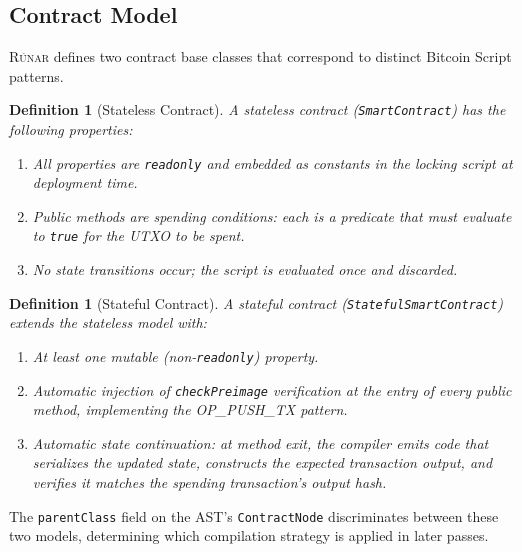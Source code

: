\documentclass[11pt,a4paper]{article}
\newtheorem{definition}[theorem]{Definition}
\newcommand{\runar}{\textsc{Rúnar}}
\begin{document}
\subsection{Contract Model}
\label{sec:contract-model}

\runar{} defines two contract base classes that correspond to distinct
Bitcoin Script patterns.

\begin{definition}[Stateless Contract]
A \emph{stateless contract} (\texttt{SmartContract}) has the following
properties:
\begin{enumerate}[label=(\alph*)]
  \item All properties are \texttt{readonly} and embedded as constants in
    the locking script at deployment time.
  \item Public methods are spending conditions: each is a predicate that must
    evaluate to \texttt{true} for the UTXO to be spent.
  \item No state transitions occur; the script is evaluated once and discarded.
\end{enumerate}
\end{definition}

\begin{definition}[Stateful Contract]
A \emph{stateful contract} (\texttt{StatefulSmartContract}) extends the
stateless model with:
\begin{enumerate}[label=(\alph*)]
  \item At least one mutable (non-\texttt{readonly}) property.
  \item Automatic injection of \texttt{checkPreimage} verification at the
    entry of every public method, implementing the OP\_PUSH\_TX pattern.
  \item Automatic state continuation: at method exit, the compiler emits
    code that serializes the updated state, constructs the expected
    transaction output, and verifies it matches the spending transaction's
    output hash.
\end{enumerate}
\end{definition}

The \texttt{parentClass} field on the AST's \texttt{ContractNode}
discriminates between these two models, determining which compilation
strategy is applied in later passes.

\end{document}
